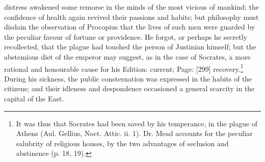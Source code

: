 distress awakened some remorse in the minds of the most vicious of mankind; the confidence of health again revived their passions and habits; but philosophy must disdain the observation of Procopius that the lives of such men were guarded by the peculiar favour of fortune or providence. He forgot, or perhaps he secretly recollected, that the plague had touched the person of Justinian himself; but the abstemious diet of the emperor may suggest, as in the case of Socrates, a more rational and honourable cause for his Edition: current; Page: [299] recovery.\footnote{It was thus that Socrates had been saved by his temperance, in the plague of Athens (Aul. Gellius, Noct. Attic. ii. 1). Dr. Mead accounts for the peculiar salubrity of religious houses, by the two advantages of seclusion and abstinence (p. 18, 19).} During his sickness, the public consternation was expressed in the habits of the citizens; and their idleness and despondence occasioned a general scarcity in the capital of the East.

